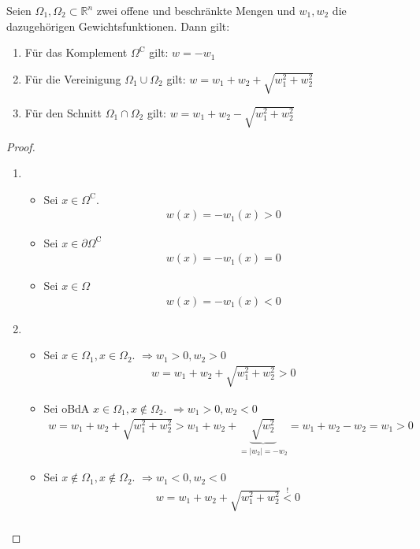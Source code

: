 \begin{theorem}
\label{thm:Gewicht}
Seien $\Omega_1, \Omega_2 \subset \mathbb{R}^n$ zwei offene und beschränkte Mengen und $w_{1}, w_{2}$ die dazugehörigen Gewichtsfunktionen. Dann gilt:
\begin{enumerate}
\item Für das Komplement $\Omega^\mathrm{C}$ gilt: $w = -w_1$
\item Für die Vereinigung $\Omega_1 \cup \Omega_2$ gilt: $w = w_1 + w_2 + \sqrt{w_1^2 + w_2^2}$
\item Für den Schnitt $\Omega_1 \cap \Omega_2$ gilt: $w = w_1 + w_2 - \sqrt{w_1^2 + w_2^2}$
\end{enumerate}
\end{theorem}
\begin{proof}
\begin{enumerate}
\item
\begin{itemize}
\item
Sei $x \in \Omega^\mathrm{C}$.
\begin{align*}
w(x) = - w_1(x) > 0
\end{align*}
\item
Sei $x \in \partial \Omega^\mathrm{C}$
\begin{align*}
w(x) = -w_1(x) = 0
\end{align*}
\item
Sei $x \in \Omega$
\begin{align*}
w(x) = -w_1(x) < 0
\end{align*}
\end{itemize}
\item
\begin{itemize}
\item
Sei $x \in \Omega_1, x \in \Omega_2$. $\Rightarrow w_1 >0, w_2>0$
\begin{align*}
w = w_1 + w_2 + \sqrt{w_1^2 + w_2^2} > 0
\end{align*}
\item
Sei \ac{oBdA} $x \in \Omega_1, x \notin \Omega_2$. $\Rightarrow w_1 > 0, w_2 < 0$
\begin{align*}
w =  w_1 + w_2 + \sqrt{w_1^2 + w_2^2} > w_1 + w_2 + \underbrace{\sqrt{w_2^2}}_{=|w_2| = -w_2} = w_1+w_2-w_2 = w_1 > 0
\end{align*}
\item
Sei $x \notin \Omega_1, x \notin \Omega_2$. $\Rightarrow w_1 < 0, w_2 < 0$
\begin{align*}
&w = w_1 + w_2 + \sqrt{w_1^2 + w_2^2} \overset{!}{<} 0\\

\end{align*}
\end{itemize}
\end{enumerate}
\end{proof}
